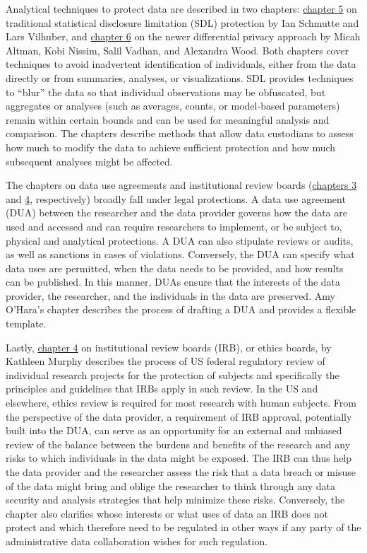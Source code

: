 \documentclass[
]{WileySix}
\begin{document}
Analytical techniques to protect data are described in two chapters: \protect\hyperlink{discavoid}{chapter 5} on traditional statistical disclosure limitation (SDL) protection by Ian Schmutte and Lars Vilhuber, and \protect\hyperlink{diffpriv}{chapter 6} on the newer differential privacy approach by Micah Altman, Kobi Nissim, Salil Vadhan, and Alexandra Wood. Both chapters cover techniques to avoid inadvertent identification of individuals, either from the data directly or from summaries, analyses, or visualizations. SDL provides techniques to ``blur'' the data so that individual observations may be obfuscated, but aggregates or analyses (such as averages, counts, or model-based parameters) remain within certain bounds and can be used for meaningful analysis and comparison. The chapters describe methods that allow data custodians to assess how much to modify the data to achieve sufficient protection and how much subsequent analyses might be affected.

The chapters on data use agreements and institutional review boards (\protect\hyperlink{dua}{chapters 3} and \protect\hyperlink{irb}{4}, respectively) broadly fall under legal protections. A data use agreement (DUA) between the researcher and the data provider governs how the data are used and accessed and can require researchers to implement, or be subject to, physical and analytical protections. A DUA can also stipulate reviews or audits, as well as sanctions in cases of violations. Conversely, the DUA can specify what data uses are permitted, when the data needs to be provided, and how results can be published. In this manner, DUAs ensure that the interests of the data provider, the researcher, and the individuals in the data are preserved. Amy O'Hara's chapter describes the process of drafting a DUA and provides a flexible template.

Lastly, \protect\hyperlink{irb}{chapter 4} on institutional review boards (IRB), or ethics boards, by Kathleen Murphy describes the process of US federal regulatory review of individual research projects for the protection of subjects and specifically the principles and guidelines that IRBs apply in such review. In the US and elsewhere, ethics review is required for most research with human subjects. From the perspective of the data provider, a requirement of IRB approval, potentially built into the DUA, can serve as an opportunity for an external and unbiased review of the balance between the burdens and benefits of the research and any risks to which individuals in the data might be exposed. The IRB can thus help the data provider and the researcher assess the risk that a data breach or misuse of the data might bring and oblige the researcher to think through any data security and analysis strategies that help minimize these risks. Conversely, the chapter also clarifies whose interests or what uses of data an IRB does not protect and which therefore need to be regulated in other ways if any party of the administrative data collaboration wishes for such regulation.
\end{document}
